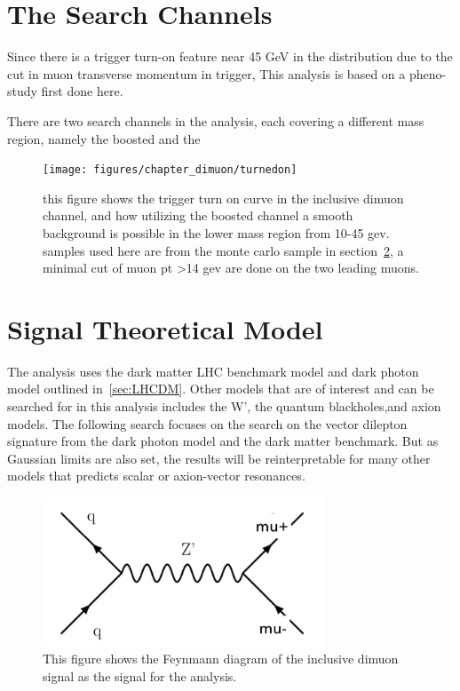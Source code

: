 \section{The Search Channels}
Since there is a trigger turn-on feature near 45 GeV in the distribution due to the cut in muon transverse momentum in trigger, 
This analysis is based on a pheno-study first done here\cite{2014}.

There are two search channels in the analysis, each covering a different mass region, namely the boosted and the 

\begin{figure}[!htb]
    \begin{center}
        \texttt{[image: figures/chapter\_dimuon/turnedon]}
        \caption{
        this figure shows the trigger turn on curve in the inclusive dimuon channel, and how utilizing the boosted channel a smooth background is possible in the lower mass region from 10-45 gev. samples used here are from the monte carlo sample in section~\ref{}, a minimal cut of muon pt >14 gev are done on the two leading muons. }
            \label{fig:turnon}
    \end{center}
\end{figure}

    \section{Signal Theoretical Model}

    The analysis uses the dark matter LHC benchmark model and dark photon model outlined in~\ref{sec:LHCDM}.
Other models that are of interest and can be searched for in this analysis includes the W', the quantum blackholes,and axion models. 
The following search focuses on the search on the vector dilepton signature from the dark photon model and the dark matter benchmark. But as Gaussian limits are also set, the results will be reinterpretable for many other models that predicts scalar or axion-vector resonances. 

\begin{figure}[!htb]
    \begin{center}
        \includegraphics[width=0.75\textwidth]{figures/chapter_dimuon/dimuonFeynman}
        \caption{
            This figure shows the Feynmann diagram of the inclusive dimuon signal as the signal for the analysis. }
            \label{fig:dimuonFeynmann}
    \end{center}
\end{figure}


